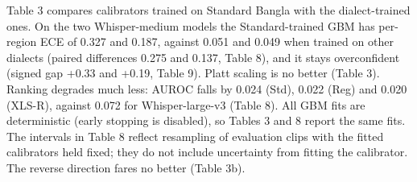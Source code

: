\documentclass[10pt]{article}
\begin{document}
Table 3 compares calibrators trained on Standard Bangla with the dialect-trained ones. On the two Whisper-medium models the Standard-trained GBM has per-region ECE of 0.327 and 0.187, against 0.051 and 0.049 when trained on other dialects (paired differences 0.275 and 0.137, Table 8), and it stays overconfident (signed gap +0.33 and +0.19, Table 9). Platt scaling is no better (Table 3). Ranking degrades much less: AUROC falls by 0.024 (Std), 0.022 (Reg) and 0.020 (XLS-R), against 0.072 for Whisper-large-v3 (Table 8). All GBM fits are deterministic (early stopping is disabled), so Tables 3 and 8 report the same fits. The intervals in Table 8 reflect resampling of evaluation clips with the fitted calibrators held fixed; they do not include uncertainty from fitting the calibrator. The reverse direction fares no better (Table 3b).
\end{document}
